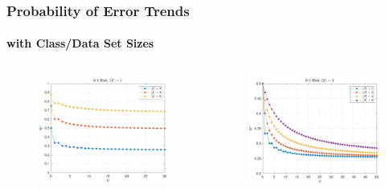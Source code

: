 \documentclass{beamer}
\begin{document}
\begin{frame}
\frametitle{Probability of Error Trends}
\framesubtitle{with Class/Data Set Sizes}

\begin{columns}[c]

\begin{column}{.5\linewidth}

\begin{figure}
\centering
\includegraphics[width=1\linewidth]{Risk_01_uni_N_leg_My.pdf}
\label{fig:Risk_01_uni_N_leg_My}
\end{figure}

\end{column}

\begin{column}{.5\linewidth}

\begin{figure}
\centering
\includegraphics[width=1\linewidth]{Risk_01_uni_N_leg_Mx.pdf}
\label{fig:Risk_01_uni_N_leg_Mx}
\end{figure}


\end{column}
\end{columns}
\end{frame}
\end{document}

